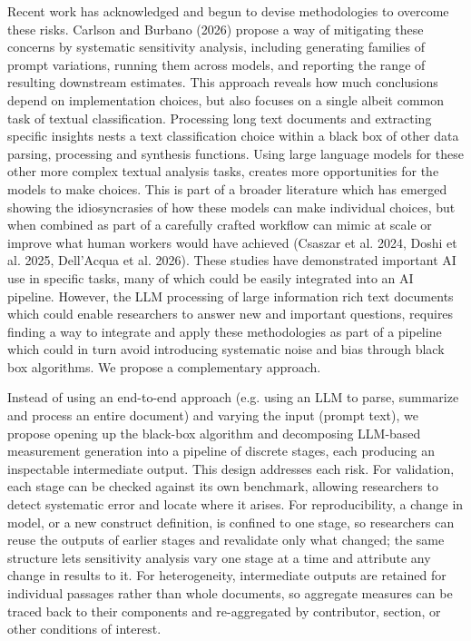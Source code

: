 \documentclass[11pt]{article}
\begin{document}
Recent work has acknowledged and begun to devise methodologies to overcome these risks. Carlson and Burbano (2026) propose a way of mitigating these concerns by systematic sensitivity analysis, including generating families of prompt variations, running them across models, and reporting the range of resulting downstream estimates. This approach reveals how much conclusions depend on implementation choices, but also focuses on a single albeit common task of textual classification. Processing long text documents and extracting specific insights nests a text classification choice within a black box of other data parsing, processing and synthesis functions. Using large language models for these other more complex textual analysis tasks, creates more opportunities for the models to make choices. This is part of a broader literature which has emerged showing the idiosyncrasies of how these models can make individual choices, but when combined as part of a carefully crafted workflow can mimic at scale or improve what human workers would have achieved (Csaszar et al. 2024, Doshi et al. 2025, Dell'Acqua et al. 2026). These studies have demonstrated important AI use in specific tasks, many of which could be easily integrated into an AI pipeline. However, the LLM processing of large information rich text documents which could enable researchers to answer new and important questions, requires finding a way to integrate and apply these methodologies as part of a pipeline which could in turn avoid introducing systematic noise and bias through black box algorithms. We propose a complementary approach.

Instead of using an end-to-end approach (e.g. using an LLM to parse, summarize and process an entire document) and varying the input (prompt text), we propose opening up the black-box algorithm and decomposing LLM-based measurement generation into a pipeline of discrete stages, each producing an inspectable intermediate output. This design addresses each risk. For validation, each stage can be checked against its own benchmark, allowing researchers to detect systematic error and locate where it arises. For reproducibility, a change in model, or a new construct definition, is confined to one stage, so researchers can reuse the outputs of earlier stages and revalidate only what changed; the same structure lets sensitivity analysis vary one stage at a time and attribute any change in results to it. For heterogeneity, intermediate outputs are retained for individual passages rather than whole documents, so aggregate measures can be traced back to their components and re-aggregated by contributor, section, or other conditions of interest.
\end{document}
